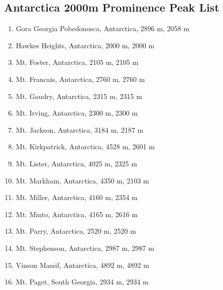 \documentclass[10pt,twocolumn,letterpaper]{article}
\begin{document}
\subsection{Antarctica 2000m Prominence Peak List}
\begin{flushleft}
\begin{enumerate}
    \item Gora Georgia Pobedonosca, Antarctica, 2896 m, 2058 m
    \item Hawkes Heights, Antarctica, 2000 m, 2000 m
    \item Mt. Foster, Antarctica, 2105 m, 2105 m
    \item Mt. Francais, Antarctica, 2760 m, 2760 m
    \item Mt. Gaudry, Antarctica, 2315 m, 2315 m
    \item Mt. Irving, Antarctica, 2300 m, 2300 m
    \item Mt. Jackson, Antarctica, 3184 m, 2187 m
    \item Mt. Kirkpatrick, Antarctica, 4528 m, 2601 m
    \item Mt. Lister, Antarctica, 4025 m, 2325 m
    \item Mt. Markham, Antarctica, 4350 m, 2103 m
    \item Mt. Miller, Antarctica, 4160 m, 2354 m
    \item Mt. Minto, Antarctica, 4165 m, 2616 m
    \item Mt. Parry, Antarctica, 2520 m, 2520 m
    \item Mt. Stephenson, Antarctica, 2987 m, 2987 m
    \item Vinson Massif, Antarctica, 4892 m, 4892 m
    \item Mt. Paget, South Georgia, 2934 m, 2934 m
\end{enumerate}
\end{flushleft}


\clearpage
\twocolumn

{\small


}
\end{document}
